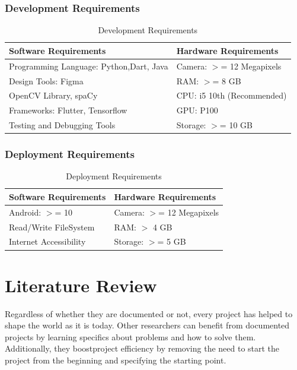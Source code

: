 \subsection{Development Requirements}
\begin{table}[h]
    \centering
    \caption{Development Requirements}
    \begin{tabular}{|l|l|}
        \hline
        \textbf{Software Requirements} & \textbf{Hardware Requirements}\\ \hline
        Programming Language: Python,Dart, Java & Camera: \(>\)= 12 Megapixels\\ \hline
        Design Tools: Figma & RAM: \(>\)= 8 GB\\ \hline
        OpenCV Library, spaCy & CPU: i5 10th (Recommended)\\ \hline
        Frameworks: Flutter, Tensorflow & GPU: P100\\ \hline
        Testing and Debugging Tools & Storage: \(>\)= 10 GB\\ \hline
    \end{tabular}
\end{table}
\newpage
\subsection{Deployment Requirements}
\begin{table}[ht]
    \centering
    \caption{Deployment Requirements}
    \begin{tabular}{|l|l|}
        \hline
        \textbf{Software Requirements} & \textbf{Hardware Requirements}\\ \hline
        Android: \(>\)= 10 & Camera: \(>\)= 12 Megapixels\\ \hline
        Read/Write FileSystem& RAM: \(>\) 4 GB\\ \hline
        Internet Accessibility & Storage: \(>\)= 5 GB\\ \hline
    \end{tabular}
\end{table}


\chapter{Literature Review}

Regardless of whether they are documented or not, every project has helped to shape the world as it is today.
Other researchers can benefit from documented projects by learning specifics about problems and how to solve
them. Additionally, they boostproject efficiency by removing the need to start the project from the beginning 
and specifying the starting point.

